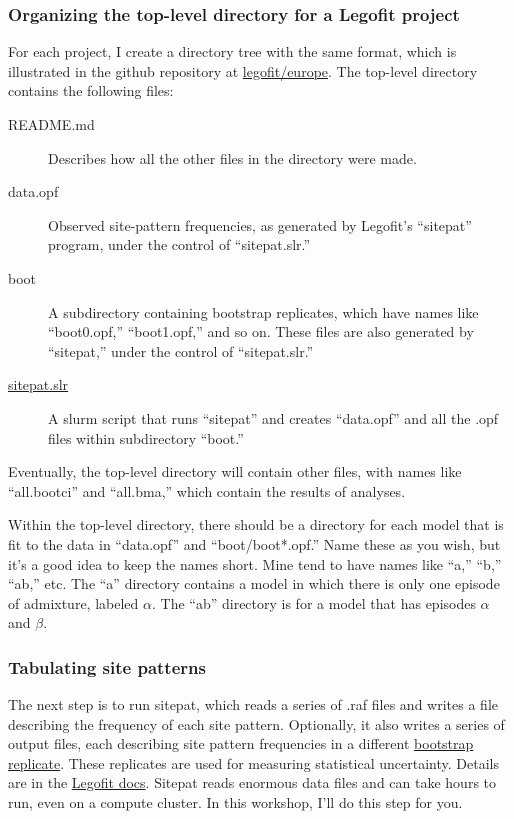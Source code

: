 \documentclass[11pt]{article}
\begin{document}
\subsubsection{Organizing the top-level directory for a Legofit project}
For each project, I create a directory tree with the same format,
which is illustrated in the github repository at
\href{https://github.com/alanrogers/agar22/tree/main/legofit/europe}{legofit/europe}.
The top-level directory contains the following files:
\begin{description}
\item[README.md]
Describes how all the other files in the directory were made.

\item[data.opf]
Observed site-pattern frequencies, as generated by Legofit's
``sitepat'' program, under the control of ``sitepat.slr.''

\item[boot]
A subdirectory containing bootstrap replicates, which have names
like ``boot0.opf,'' ``boot1.opf,'' and so on. These files are also
generated by ``sitepat,'' under the control of ``sitepat.slr.''

\item[\href{sitepat.slr.html}{sitepat.slr}]
A slurm script that runs ``sitepat'' and creates ``data.opf'' and all
the .opf files within subdirectory ``boot.''
\end{description}
Eventually, the top-level directory will contain other files, with
names like ``all.bootci'' and ``all.bma,'' which contain the results
of analyses.

Within the top-level directory, there should be a directory for each
model that is fit to the data in ``data.opf'' and ``boot/boot*.opf.''
Name these as you wish, but it's a good idea to keep the names
short. Mine tend to have names like ``a,'' ``b,'' ``ab,'' etc. The
``a'' directory contains a model in which there is only one episode of
admixture, labeled $\alpha$. The ``ab'' directory is for a model that
has episodes $\alpha$ and $\beta$.

\subsubsection{Tabulating site patterns}
The next step is to run sitepat, which reads a series of .raf files
and writes a file describing the frequency of each site
pattern. Optionally, it also writes a series of output files, each
describing site pattern frequencies in a different
\href{https://en.wikipedia.org/wiki/Bootstrapping_(statistics)}{bootstrap
  replicate}. These replicates are used for measuring statistical
uncertainty. Details are in the
\href{https://alanrogers.github.io/legofit/html/sitepat.html}{Legofit
  docs}. Sitepat reads enormous data files and can take hours to run,
even on a compute cluster. In this workshop, I'll do this step for
you.
\end{document}
